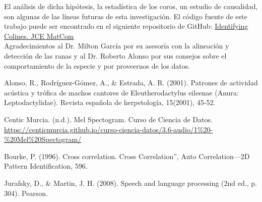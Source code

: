 \documentclass[a4paper,10pt,twocolumn]{article}
\begin{document}
El análisis de dicha hipótesis, la estadística de los coros,
un estudio de causalidad, son algunas de las líneas futuras de esta investigación. 
El código fuente de este trabajo puede ser encontrado en el siguiente repositorio de GitHub:
\href{https://github.com/DanielMPMatCom/Identifying-Colines.-JCE-MatCom.git}{Identifying Colines. JCE MatCom}\\


Agradecimientos al Dr. Milton García por su asesoría con la alineación y detección de las ranas y al Dr. Roberto Alonso por sus consejos sobre el comportamiento de la especie y por proveernos de los datos.

\begin{thebibliography}{}
	
	 Alonso, R., Rodríguez-Gómez, A., \& Estrada, A. R. (2001). Patrones de actividad acústica y trófica de machos cantores de Eleutherodactylus eileenae (Anura: Leptodactylidae). Revista española de herpetología, 15(2001), 45-52.

	
	 Centic Murcia. (n.d.). Mel Spectogram. Curso de Ciencia de Datos. \href{https://centicmurcia.github.io/curso-ciencia-datos/3.6-audio/1\%20-\%20Mel\%20Spectogram/}{https://centicmurcia.github.io/curso-ciencia-datos/3.6-audio/1\%20-\%20Mel\%20Spectogram/}
	
	\sloppypar
	 Bourke, P. (1996). Cross correlation. Cross Correlation”, Auto Correlation—2D Pattern Identification, 596.
  
	 Jurafsky, D., \& Martin, J. H. (2008). Speech and language processing (2nd ed., p. 304). Pearson.

\end{thebibliography}
	  




\label{end}
\end{document}
